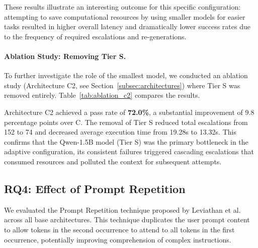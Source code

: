 These results illustrate an interesting outcome for this specific configuration: attempting to save computational resources by using smaller models for easier tasks resulted in higher overall latency and dramatically lower success rates due to the frequency of required escalations and re-generations.

\paragraph{Ablation Study: Removing Tier S.}
To further investigate the role of the smallest model, we conducted an ablation study (Architecture C2, see Section~\ref{subsec:architectures}) where Tier S was removed entirely. Table~\ref{tab:ablation_c2} compares the results.

\begin{table}[ht]
    \centering
    \caption{Ablation Study: Removing Tier S (C2) vs Full Adaptive (C).}
    \label{tab:ablation_c2}
\end{table}

Architecture C2 achieved a pass rate of \textbf{72.0\%}, a substantial improvement of 9.8 percentage points over C. The removal of Tier S reduced total escalations from 152 to 74 and decreased average execution time from 19.28s to 13.32s. This confirms that the Qwen-1.5B model (Tier S) was the primary bottleneck in the adaptive configuration, its consistent failures triggered cascading escalations that consumed resources and polluted the context for subsequent attempts.

\subsection{RQ4: Effect of Prompt Repetition}
\label{subsec:rq4_results}

We evaluated the Prompt Repetition technique proposed by Leviathan et al.~\cite{leviathan2025prompt} across all base architectures. This technique duplicates the user prompt content to allow tokens in the second occurrence to attend to all tokens in the first occurrence, potentially improving comprehension of complex instructions.

